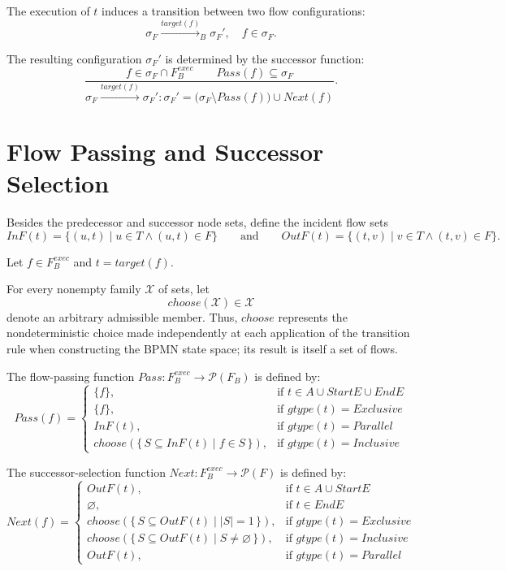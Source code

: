 \documentclass[11pt,a4paper]{article}
\newcommand{\StartE}{\mathit{StartE}}
\newcommand{\EndE}{\mathit{EndE}}
\newcommand{\gtype}{\mathit{gtype}}
\newcommand{\InF}{\mathit{InF}}
\newcommand{\OutF}{\mathit{OutF}}
\begin{document}
The execution of $t$ induces a transition between two flow configurations:
\[
\sigma_F \xrightarrow{\mathit{target}(f)}_{B} \sigma_F',\quad f \in \sigma_F.
\]

The resulting configuration $\sigma_F'$ is determined by the successor function:
\[
\frac{
f \in \sigma_F \cap F_B^{exec}
\qquad
\mathit{Pass}(f) \subseteq \sigma_F
}{
\sigma_F \xrightarrow{\mathit{target}(f)} \sigma_F' :
\sigma_F' = \bigl(\sigma_F \setminus \mathit{Pass}(f)\bigr)
\cup
\mathit{Next}(f)
}.
\tag{EXEC}
\]

\section{Flow Passing and Successor Selection}

Besides the predecessor and successor node sets, define the incident flow sets
\[
\InF(t) = \{ (u, t) \mid u \in T \land (u, t) \in F \}
\qquad\text{and}\qquad
\OutF(t) = \{ (t, v) \mid v \in T \land (t, v) \in F \}.
\]

Let $f \in F_B^{exec}$ and $t = \mathit{target}(f)$.

For every nonempty family $\mathcal X$ of sets, let
\[
\mathit{choose}(\mathcal X)\in\mathcal X
\]
denote an arbitrary admissible member. Thus, $\mathit{choose}$ represents
the nondeterministic choice made independently at each application of the
transition rule when constructing the BPMN state space; its result is itself
a set of flows.

The flow-passing function
$\mathit{Pass}: F_B^{exec} \rightarrow \mathcal{P}(F_B)$ is defined by:
\[
\mathit{Pass}(f) =
\left\{
\begin{array}{ll}
\{ f \}, & \text{if } t \in A \cup \StartE \cup \EndE \\[4pt]
\{ f \}, & \text{if } \gtype(t) = \mathit{Exclusive} \\[4pt]
\InF(t), & \text{if } \gtype(t) = \mathit{Parallel} \\[4pt]
\mathit{choose}\!\left(
\{\,S\subseteq\InF(t)\mid f\in S\,\}
\right), & \text{if } \gtype(t) = \mathit{Inclusive}
\end{array}
\right.
\]

The successor-selection function
$\mathit{Next}: F_B^{exec} \rightarrow \mathcal{P}(F)$ is defined by:
\[
\mathit{Next}(f) =
\left\{
\begin{array}{ll}
\OutF(t), & \text{if } t \in A \cup \StartE \\[4pt]
\varnothing, & \text{if } t \in \EndE \\[4pt]
\mathit{choose}\!\left(
\{\,S\subseteq\OutF(t)\mid |S|=1\,\}
\right), & \text{if } \gtype(t) = \mathit{Exclusive} \\[4pt]
\mathit{choose}\!\left(
\{\,S\subseteq\OutF(t)\mid S\neq\varnothing\,\}
\right), & \text{if } \gtype(t) = \mathit{Inclusive} \\[4pt]
\OutF(t), & \text{if } \gtype(t) = \mathit{Parallel}
\end{array}
\right.
\]
\end{document}
